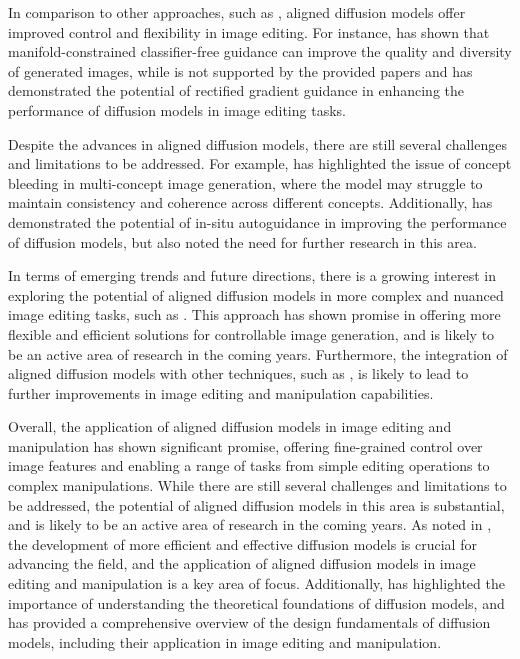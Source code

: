 \documentclass[11pt,a4paper]{article}
\begin{document}
In comparison to other approaches, such as \cite{arxiv:2207.12598}, aligned diffusion models offer improved control and flexibility in image editing. For instance, \cite{arxiv:2406.08070} has shown that manifold-constrained classifier-free guidance can improve the quality and diversity of generated images, while \cite{arxiv:2408.09000} is not supported by the provided papers and \cite{arxiv:2501.18865} has demonstrated the potential of rectified gradient guidance in enhancing the performance of diffusion models in image editing tasks.

Despite the advances in aligned diffusion models, there are still several challenges and limitations to be addressed. For example, \cite{doi:10.1109/tvcg.2024.3506992} has highlighted the issue of concept bleeding in multi-concept image generation, where the model may struggle to maintain consistency and coherence across different concepts. Additionally, \cite{arxiv:2510.17136} has demonstrated the potential of in-situ autoguidance in improving the performance of diffusion models, but also noted the need for further research in this area.

In terms of emerging trends and future directions, there is a growing interest in exploring the potential of aligned diffusion models in more complex and nuanced image editing tasks, such as \cite{doi:10.1109/tip.2026.3654412}. This approach has shown promise in offering more flexible and efficient solutions for controllable image generation, and is likely to be an active area of research in the coming years. Furthermore, the integration of aligned diffusion models with other techniques, such as \cite{arxiv:2501.18865}, is likely to lead to further improvements in image editing and manipulation capabilities.

Overall, the application of aligned diffusion models in image editing and manipulation has shown significant promise, offering fine-grained control over image features and enabling a range of tasks from simple editing operations to complex manipulations. While there are still several challenges and limitations to be addressed, the potential of aligned diffusion models in this area is substantial, and is likely to be an active area of research in the coming years. As noted in \cite{doi:10.1145/3626235}, the development of more efficient and effective diffusion models is crucial for advancing the field, and the application of aligned diffusion models in image editing and manipulation is a key area of focus. Additionally, \cite{doi:10.1109/tkde.2024.3361474} has highlighted the importance of understanding the theoretical foundations of diffusion models, and \cite{arxiv:2306.04542} has provided a comprehensive overview of the design fundamentals of diffusion models, including their application in image editing and manipulation.
\end{document}
